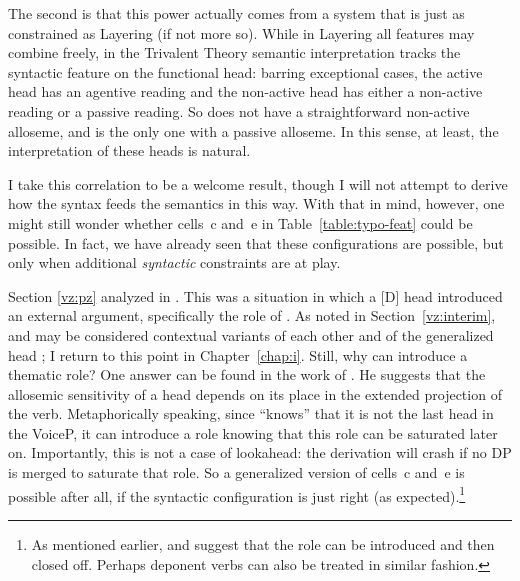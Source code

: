 \begin{exe}
\begin{xlist}
\begin{exe}
\begin{exe}
\begin{xlist}
\begin{exe}
\begin{exe}
\begin{exe}
\begin{exe}
\begin{exe}
\begin{xlist}
\label{r1:6:2}The second is that this power actually comes from a system that is just as constrained as Layering (if not more so). While in Layering all features may combine freely, in the Trivalent Theory semantic interpretation tracks the syntactic feature on the functional head: barring exceptional cases, the active head {\vd} has an agentive reading and the non-active head {\vz} has either a non-active reading or a passive reading. So {\vd} does not have a straightforward non-active alloseme, and {\vz} is the only one with a passive alloseme. In this sense, at least, the interpretation of these heads is natural.\largerpage[-2]

I take this correlation to be a welcome result, though I will not attempt to derive how the syntax feeds the semantics in this way. With that in mind, however, one might still wonder whether cells~c and~e in Table~\ref{table:typo-feat} could be possible. In fact, we have already seen that these configurations are possible, but only when additional \emph{syntactic} constraints are at play.

Section \ref{vz:pz} analyzed  in {\tnif}. This was a situation in which a [\textminus{}D] head introduced an external argument, specifically the  role of {\pz}. As noted in Section~\ref{vz:interim}, {\pz} and {\vz} may be considered contextual variants of each other and of the generalized head \emph{}; I return to this point in Chapter~\ref{chap:i}. Still, why can {\pz} introduce a thematic role? One answer can be found in the work of \cite{wood15springer}. He suggests that the allosemic sensitivity of a head depends on its place in the extended projection of the verb. Metaphorically speaking, since {\pz} ``knows'' that it is not the last head in the VoiceP, it can introduce a  role knowing that this role can be saturated later on. Importantly, this is not a case of lookahead: the derivation will crash if no DP is merged to saturate that role. So a generalized version of cells~c and~e is possible after all, if the syntactic configuration is just right (as expected).\footnote{As mentioned earlier, \cite{legate14} and \cite{akkus19jl} suggest that the  role can be introduced and then closed off. Perhaps deponent verbs can also be treated in similar fashion.}


\end{xlist}
\end{exe}
\end{exe}
\end{exe}
\end{exe}
\end{exe}
\end{xlist}
\end{exe}
\end{exe}
\end{xlist}
\end{exe}

